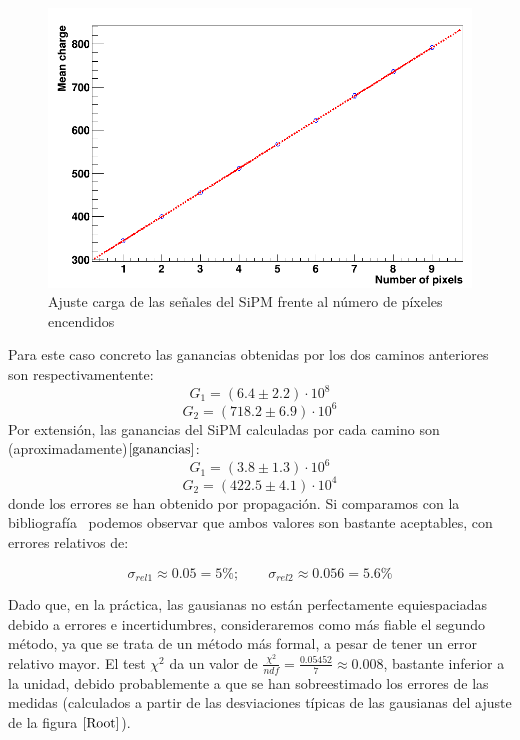 \begin{enumerate}
\begin{enumerate}
	\begin{figure}[hbtp]
		\centering
		\includegraphics[scale=0.4]{FitPosicionPixels.png}
		\caption{Ajuste carga de las señales del SiPM frente al número de píxeles encendidos\label{ajuste}}
		\end{figure}
			
	\end{enumerate}
	
Para este caso concreto las ganancias obtenidas por los dos caminos anteriores son respectivamentente:
\begin{equation}
G_1= (6.4 \pm 2.2) \cdot 10^8
\label{gananciatotalmetodo1} 
\end{equation}
\begin{equation}
G_2= (718.2 \pm 6.9) \cdot 10^6
\label{gananciatotalmetodo2}
\end{equation}
Por extensión, las ganancias del SiPM calculadas por cada camino son (aproximadamente)$\eqref{ganancias}$: 
\begin{equation}
G_1= (3.8 \pm 1.3) \cdot 10^6
\label{gananciaSiPMmetodo1}
\end{equation}
\begin{equation}
G_2= (422.5 \pm 4.1) \cdot 10^4
\label{gananciaSiPMmetodo2}
\end{equation}
donde los errores se han obtenido por propagación. Si comparamos con la bibliografía~\cite{datasheet SiPM} podemos observar que ambos valores son bastante aceptables, con errores relativos de:

\begin{equation}
\sigma_{rel1} \approx 0.05 = 5\%; \qquad \sigma_{rel2} \approx 0.056 = 5.6\%
\label{erroresgananciasSiPM}
\end{equation}


Dado que, en la práctica, las gausianas no están perfectamente equiespaciadas debido a errores e incertidumbres, consideraremos como más fiable el segundo método, ya que se trata de un método más formal, a pesar de tener un error relativo mayor.
El test $\chi^2$ da un valor de  $\frac{\chi^2}{ndf}=\frac{0.05452}{7}\approx 0.008$, bastante inferior a la unidad, debido  probablemente a que se han sobreestimado los errores de las medidas (calculados a partir de las desviaciones típicas de las gausianas del ajuste de la figura $\ref{Root}$).

\end{enumerate}